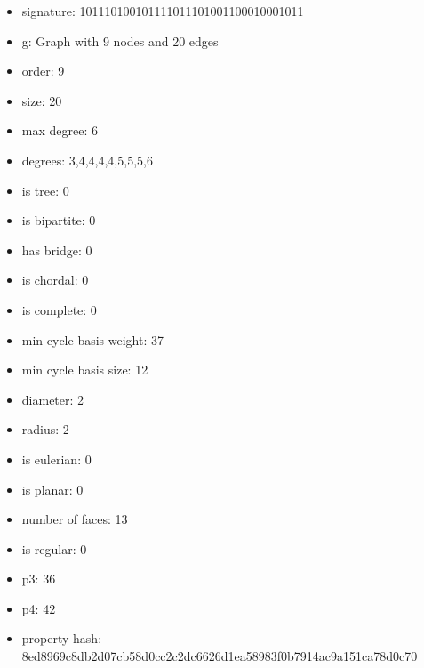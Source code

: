 \newpage
\begin{figure}
\end{figure}
\begin{itemize}
\item signature: 101110100101111011101001100010001011
\item g: Graph with 9 nodes and 20 edges
\item order: 9
\item size: 20
\item max degree: 6
\item degrees: 3,4,4,4,4,5,5,5,6
\item is tree: 0
\item is bipartite: 0
\item has bridge: 0
\item is chordal: 0
\item is complete: 0
\item min cycle basis weight: 37
\item min cycle basis size: 12
\item diameter: 2
\item radius: 2
\item is eulerian: 0
\item is planar: 0
\item number of faces: 13
\item is regular: 0
\item p3: 36
\item p4: 42
\item property hash: 8ed8969c8db2d07cb58d0cc2c2dc6626d1ea58983f0b7914ac9a151ca78d0c70
\end{itemize}

